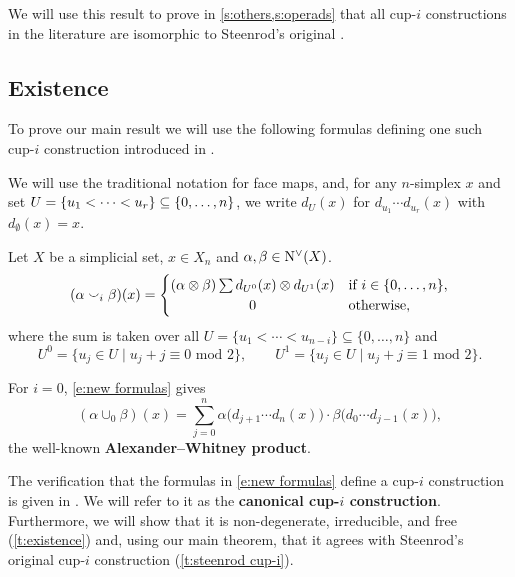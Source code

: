 We will use this result to prove in \cref{s:others,s:operads} that all \mbox{cup-$i$} constructions in the literature are isomorphic to Steenrod's original \cite{steenrod1947products}.

\subsection{Existence}

To prove our main result we will use the following formulas defining one such \mbox{cup-$i$} construction introduced in \cite{medina2023fast_sq}.

\begin{notation*}
	We will use the traditional notation for face maps, and, for any $n$-simplex $x$ and set $U = \{u_1 < \dots < u_r\} \subseteq \set[big]{0,\dots,n}$, we write $d_U(x)$ for $d_{u_1}\! \dotsm d_{u_r}(x)$ with $d_{\emptyset}(x) = x$.
\end{notation*}

\begin{definition} \label{d:my cup-i}
	Let $X$ be a simplicial set, $x \in X_n$ and $\alpha, \beta \in \operatorname{N^{\vee}}(X)$.
	\begin{equation}\label{e:new formulas}
	(\alpha \cup_i \beta)(x) =
	\begin{cases}
	(\alpha \ot \beta) \sum d_{U^0}(x) \ot d_{U^1}(x) &
	\text{if } i \in \{0, \dots, n\}, \\
	\hfil 0 &
	\text{otherwise},
	\end{cases}
	\end{equation}
	where the sum is taken over all $U = \{u_1 < \cdots < u_{n-i}\} \subseteq \{0, \dots, n\}$ and
	\begin{equation*}
	U^0 = \{u_j \in U \mid u_j + j \equiv 0 \text{ mod } 2\}, \qquad
	U^1 = \{u_j \in U \mid u_j + j \equiv 1 \text{ mod } 2\}.
	\end{equation*}
\end{definition}

\begin{example}
	For $i = 0$, \cref{e:new formulas} gives
	\begin{equation*}
	(\alpha \cup_0 \beta)(x) =
	\sum_{j=0}^n \alpha \big(d_{j+1} \cdots d_{n}(x)\big) \cdot \beta \big(d_{0} \cdots d_{j-1}(x)\big),
	\end{equation*}
	the well-known \textbf{Alexander--Whitney product}.
\end{example}

The verification that the formulas in \cref{e:new formulas} define a \mbox{cup-$i$} construction is given in \cite{medina2023fast_sq}.
We will refer to it as the \textbf{canonical \mbox{cup-$i$} construction}.
Furthermore, we will show that it is non-degenerate, irreducible, and free (\cref{t:existence}) and, using our main theorem, that it agrees with Steenrod's original cup-$i$ construction (\cref{t:steenrod cup-i}).